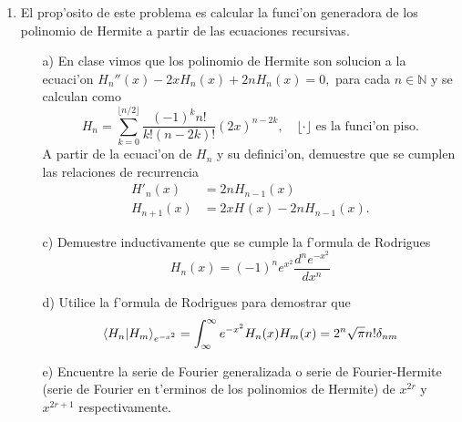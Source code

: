 \documentclass[letterpaper]{article}
\newcommand{\nat}{\ensuremath{ \mathbb N }}
\begin{document}
\begin{enumerate}
  \item El prop'osito de este problema es calcular la funci'on generadora de los polinomio de Hermite a partir de las ecuaciones recursivas.
        \begin{itemize}
          \item[a)] En clase vimos que los polinomio de Hermite son solucion a la ecuaci'on $H_{n}''(x)-2xH_{n}(x)+2nH_{n}(x)=0,$ para cada $n\in\nat$ y se calculan como
\[
      H_{n}=\sum_{k=0}^{\lfloor n/2\rfloor}\frac{(-1)^{k}n!}{k!(n-2k)!}(2x)^{n-2k},\quad\lfloor\cdot\rfloor\text{ es la funci'on piso.}
\]
          A partir de la ecuaci'on de $H_{n}$ y su definici'on, demuestre que se cumplen las relaciones de recurrencia
          \begin{align*}
            H'_{n}(x)&=2nH_{n-1}(x)\\
            H_{n+1}(x)&=2xH_{}(x)-2nH_{n-1}(x).
          \end{align*}
          \item[c)] Demuestre inductivamente que se cumple la f'ormula de Rodrigues
                \[
                H_{n}(x)=(-1)^{n}e^{x^{2}}\dfrac{d^{n}e^{-x^{2}}}{dx^{n}}
                \]
          \item[d)] Utilice la f'ormula de Rodrigues para demostrar que
                \[
                \braket{H_{n}|H_{m}}_{e^{-x^{2}}}=\int_{\infty}^{\infty}e^{-x^{2}}H_{n}(x)H_{m}(x)=2^{n}\sqrt{\pi}n!\delta_{nm}
                \]
          \item[e)] Encuentre la serie de Fourier generalizada o serie de Fourier-Hermite (serie de Fourier en t'erminos de los polinomios de Hermite) de $x^{2r}$ y $x^{2r+1}$ respectivamente.
        \end{itemize}


\end{enumerate}
\end{document}
